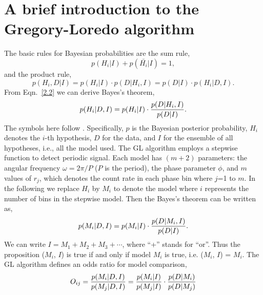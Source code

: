 \documentclass[fleqn,usenatbib]{mnras}
\begin{document}

{}

\appendix
\section{A brief introduction to the Gregory-Loredo algorithm}\label{GL}
The basic rules for Bayesian probabilities are the sum rule,
\begin{equation}
p(H_i|I)+p(\bar{H_i}|I)	=1,
\end{equation}
and the product rule,
\begin{equation}\label{2.2}
p(H_i,D|I)=p(H_i|I)\cdot p(D|H_i,I)=p(D|I)\cdot p(H_i|D,I).
\end{equation}
From Eqn.~\ref{2.2} we can derive Bayes's theorem,
\begin{equation}\label{2.5} 
p(H_i|D,I)=p(H_i|I)\cdot {p(D|H_i,I)\over p(D|I)}.
\end{equation}
The symbols here follow \cite{1992ApJ...398..146G}.
Specifically, $p$ is the Bayesian posterior probability, $H_i$ denotes the $i$-th hypothesis, $D$ for the data, and $I$ for the ensemble of all hypotheses, i.e., all the model used.
The GL algorithm employs a stepwise function to detect periodic signal. Each model has $(m+2)$ parameters: the angular frequency $\omega={2\pi/P}$ ($P$ is the period), the phase parameter $\phi$, and $m$ values of $r_j$, which denotes the count rate in each phase bin where $j$=1 to $m$. In the following we replace $H_i$ by $M_i$ to denote the model where $i$ represents the number of bins in the stepwise model. Then the Bayes's theorem can be written as,
 \begin{equation}\label{2.11}
 p(M_i|D,I)=p(M_i|I)\cdot {p(D|M_i,I)\over p(D|I)}.
 \end{equation} 
We can write $I=M_1+M_2+M_3+\cdots$, where ``+'' stands for ``or''. Thus the proposition ($M_i$, $I$) is true if and only if model $M_i$ is true, i.e. ($M_i$, $I$) = $M_i$. The GL algorithm defines an odds ratio for model comparison,
\begin{equation}\label{2.12}
O_{ij}={p(M_i|D,I)\over p(M_j|D,I)}={p(M_i|I)\over p(M_j|I)}\cdot {p(D|M_i)\over p(D|M_j)}
\end{equation}
\end{document}
